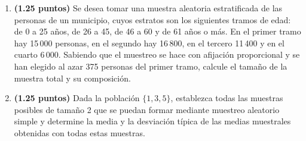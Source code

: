 
\begin{enumerate}[label=\alph*)]
  \item \textbf{(1.25 puntos)} Se desea tomar una muestra aleatoria
  estratificada de las personas de un municipio, cuyos estratos son los
  siguientes tramos de edad: de 0 a 25 años, de 26 a 45, de 46 a 60 y de
  61 años o más. En el primer tramo hay 15\,000 personas, en el segundo
  hay 16\,800, en el tercero 11\,400 y en el cuarto 6\,000. Sabiendo que el
  muestreo se hace con afijación proporcional y se han elegido al azar
  375 personas del primer tramo, calcule el tamaño de la muestra total
  y su composición.
  \item \textbf{(1.25 puntos)} Dada la población $\{1,3,5\}$, establezca
  todas las muestras posibles de tamaño 2 que se puedan formar mediante
  muestreo aleatorio simple y determine la media y la desviación típica
  de las medias muestrales obtenidas con todas estas muestras.
\end{enumerate}
